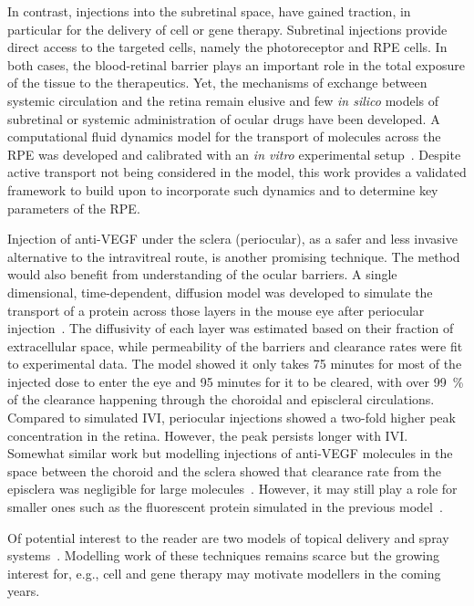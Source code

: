 \documentclass{article}
\begin{document}
In contrast, injections into the subretinal space, have gained traction, in particular for the delivery of cell or gene therapy.
Subretinal injections provide direct access to the targeted cells, namely the photoreceptor and RPE cells.
In both cases, the blood-retinal barrier plays an important role in the total exposure of the tissue to the therapeutics.
Yet, the mechanisms of exchange between systemic circulation and the retina remain elusive and few \textit{in silico} models of subretinal or systemic administration of ocular drugs have been developed.
A computational fluid dynamics model for the transport of molecules across the RPE was developed and calibrated with an \textit{in vitro} experimental setup~\cite{Davies_2020}.
Despite active transport not being considered in the model, this work provides a validated framework to build upon to incorporate such dynamics and to determine key parameters of the RPE.

Injection of anti-VEGF under the sclera (periocular), as a safer and less invasive alternative to the intravitreal route, is another promising technique.
The method would also benefit from understanding of the ocular barriers.
A single dimensional, time-dependent, diffusion model was developed to simulate the transport of a protein across those layers in the mouse eye after periocular injection~\cite{Gabhann_2007}.
The diffusivity of each layer was estimated based on their fraction of extracellular space, while permeability of the barriers and clearance rates were fit to experimental data.
The model showed it only takes 75 minutes for most of the injected dose to enter the eye and 95 minutes for it to be cleared, with over \SI{99}{\percent} of the clearance happening through the choroidal and episcleral circulations.
Compared to simulated IVI, periocular injections showed a two-fold higher peak concentration in the retina.
However, the peak persists longer with IVI.
Somewhat similar work but modelling injections of anti-VEGF molecules in the space between the choroid and the sclera showed that clearance rate from the episclera was negligible for large molecules~\cite{Zhang_2018}.
However, it may still play a role for smaller ones such as the fluorescent protein simulated in the previous model~\cite{Gabhann_2007}.

Of potential interest to the reader are two models of topical delivery and spray systems~\cite{Mori_2017,Nweze_2020}.
Modelling work of these techniques remains scarce but the growing interest for, e.g., cell and gene therapy may motivate modellers in the coming years.
\end{document}
